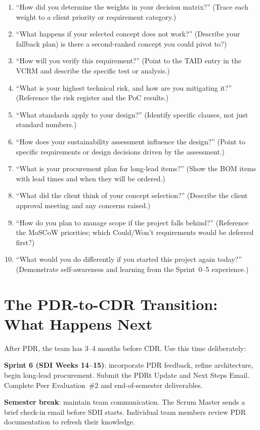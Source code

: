 \begin{enumerate}[nosep,leftmargin=1.5em]
\item ``How did you determine the weights in your decision matrix?'' (Trace each weight to a client priority or requirement category.)
\item ``What happens if your selected concept does not work?'' (Describe your fallback plan) is there a second-ranked concept you could pivot to?)
\item ``How will you verify this requirement?'' (Point to the TAID entry in the VCRM and describe the specific test or analysis.)
\item ``What is your highest technical risk, and how are you mitigating it?'' (Reference the risk register and the PoC results.)
\item ``What standards apply to your design?'' (Identify specific clauses, not just standard numbers.)
\item ``How does your sustainability assessment influence the design?'' (Point to specific requirements or design decisions driven by the assessment.)
\item ``What is your procurement plan for long-lead items?'' (Show the BOM items with lead times and when they will be ordered.)
\item ``What did the client think of your concept selection?'' (Describe the client approval meeting and any concerns raised.)
\item ``How do you plan to manage scope if the project falls behind?'' (Reference the MoSCoW priorities; which Could/Won't requirements would be deferred first?)
\item ``What would you do differently if you started this project again today?'' (Demonstrate self-awareness and learning from the Sprint~0--5 experience.)
\end{enumerate}



\section{The PDR-to-CDR Transition: What Happens Next}
After PDR, the team has 3--4 months before CDR. Use this time deliberately:

\textbf{Sprint 6 (SDI Weeks 14--15)}: incorporate PDR feedback, refine architecture, begin long-lead procurement. Submit the PDRt Update and Next Steps Email. Complete Peer Evaluation~\#2 and end-of-semester deliverables.

\textbf{Semester break}: maintain team communication. The Scrum Master sends a brief check-in email before SDII starts. Individual team members review PDR documentation to refresh their knowledge.

